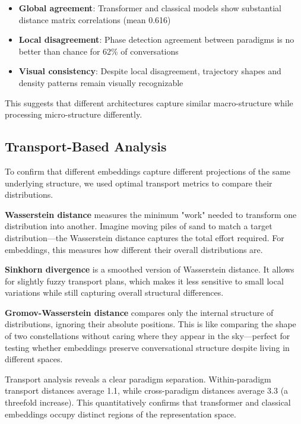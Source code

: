 \documentclass[11pt,letterpaper]{article}
\newcommand{\crossParadigmCorr}{0.616}
\begin{document}
\begin{itemize}
\item \textbf{Global agreement}: Transformer and classical models show substantial distance matrix correlations (mean \crossParadigmCorr{})
\item \textbf{Local disagreement}: Phase detection agreement between paradigms is no better than chance for 62\% of conversations
\item \textbf{Visual consistency}: Despite local disagreement, trajectory shapes and density patterns remain visually recognizable
\end{itemize}

This suggests that different architectures capture similar macro-structure while processing micro-structure differently.

\subsection{Transport-Based Analysis}

To confirm that different embeddings capture different projections of the same underlying structure, we used optimal transport metrics to compare their distributions.

\textbf{Wasserstein distance} measures the minimum "work" needed to transform one distribution into another. Imagine moving piles of sand to match a target distribution—the Wasserstein distance captures the total effort required. For embeddings, this measures how different their overall distributions are.

\textbf{Sinkhorn divergence} is a smoothed version of Wasserstein distance. It allows for slightly fuzzy transport plans, which makes it less sensitive to small local variations while still capturing overall structural differences.

\textbf{Gromov-Wasserstein distance} compares only the internal structure of distributions, ignoring their absolute positions. This is like comparing the shape of two constellations without caring where they appear in the sky—perfect for testing whether embeddings preserve conversational structure despite living in different spaces.

Transport analysis reveals a clear paradigm separation. Within-paradigm transport distances average 1.1, while cross-paradigm distances average 3.3 (a threefold increase). This quantitatively confirms that transformer and classical embeddings occupy distinct regions of the representation space.
\end{document}
